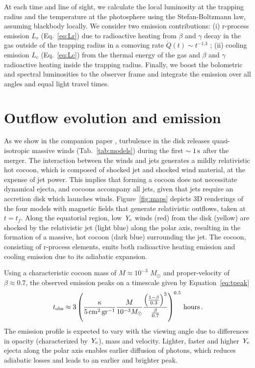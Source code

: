 \documentclass[twocolumn,dvipsnames]{aastex62}
\newcommand{\tobs}{\,{t_{\rm obs}}}
\newcommand{\msun}{\,{M_{\odot}}}
\newcommand{\Ye}{\,{Y_{\rm e}}}
\begin{document}
At each time and line of sight, we calculate the local luminosity at the trapping radius and the temperature at the photosphere using the Stefan-Boltzmann law, assuming blackbody locally. We consider two emission contributions: (i) r-process emission $ L_r $ (Eq.~\eqref{eq:Lr}) due to radioactive heating from $ \beta $ and $ \gamma $ decay in the gas outside of the trapping radius in a comoving rate $ \dot{Q}(t) \sim t^{-1.3} $ \citep[e.g.,][]{Metzger2010a}; (ii) cooling emission $ L_c $ (Eq.~\eqref{eq:Lc}) from the thermal energy of the gas and $ \beta $ and $ \gamma $ radioactive heating inside the trapping radius. Finally, we boost the bolometric and spectral luminosities to the observer frame and integrate the emission over all angles and equal light travel times.
 
\section{Outflow evolution and emission}\label{sec:results}

As we show in the companion paper \citet{Gottlieb2023}, turbulence in the disk releases quasi-isotropic massive winds (Tab.~\ref{tab:models}) during the first $ \sim 1\,{\rm s} $ after the merger. The interaction between the winds and jets generates a mildly relativistic hot cocoon, which is composed of shocked jet and shocked wind material, at the expense of jet power. This implies that forming a cocoon does not necessitate dynamical ejecta, and cocoons accompany all jets, given that jets require an accretion disk which launches winds.
Figure~\ref{fig:maps} depicts 3D renderings of the four models with magnetic fields that generate relativistic outflows, taken at $ t = t_f $. Along the equatorial region, low $ \Ye $ winds (red) from the disk (yellow) are shocked by the relativistic jet (light blue) along the polar axis, resulting in the formation of a massive, hot cocoon (dark blue) surrounding the jet. The cocoon, consisting of r-process elements, emits both radioactive heating emission and cooling emission due to its adiabatic expansion.

Using a characteristic cocoon mass of $ M \approx 10^{-3}\,\msun$ and proper-velocity of $\beta \approx 0.7 $, the observed emission peaks on a timescale given by Equation~\eqref{eq:tpeak}
\begin{equation}\label{eq:time}
\tobs \approx 3\left(\frac{\kappa}{{\rm 5\,cm^2\,gr^{-1}}}\frac{M}{10^{-3}M_\odot}\frac{\left(\frac{1-\beta}{0.3}\right)^3}{\frac{\beta}{0.7}}\right)^{0.5}\,{\rm hours}\,.
\end{equation}
The emission profile is expected to vary with the viewing angle due to differences in opacity (characterized by $\Ye$), mass and velocity. Lighter, faster and higher $ \Ye $ ejecta along the polar axis enables earlier diffusion of photons, which reduces adiabatic losses and leads to an earlier and brighter peak.
\end{document}

